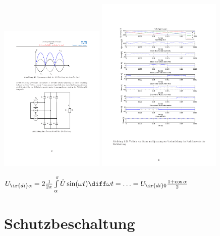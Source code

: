 \documentclass[fs, footer]{latex4ei}
\begin{document}
\begin{multicols*}{4}
{	\includegraphics[width=5cm]{img/B6-Schaltung.pdf}
	\includegraphics[width=6cm]{img/03-B6-Spannungsverlauf.pdf}
	
	$U_{\ir{di} \alpha} = 2 \frac{1}{2 \pi} \int \limits_\alpha^\pi \hat U \sin (\omega t) \diff \omega t = \ldots = U_{\ir{di}0} \frac{1 + \cos \alpha}{2}$
}

\section{Schutzbeschaltung}

\end{multicols*}
\end{document}
